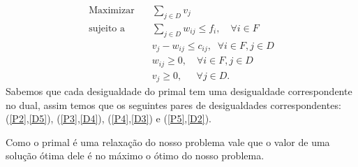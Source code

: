 \documentclass[12pt]{article}
\begin{document}
    \begin{align}
        \text{Maximizar} \quad & \sum_{j \in D} v_{j} \tag{D1} \label{D1}\\
        \text{sujeito a} \quad & \sum_{j\in D} w_{ij}\leq f_i, \quad \forall i \in F \tag{D2} \label{D2}\\
        &v_{j} - w_{ij}\leq c_{ij},  \; \; \forall i\in F,j\in D \tag{D3} \label{D3}\\
        &w_{ij} \geq 0 ,\quad \forall i\in F,j\in D\tag{D4} \label{D4}\\
        &v_j \geq 0, \quad \; \,\forall j\in D \tag{D5} \label{D5}.
       \end{align}
Sabemos que cada desigualdade do primal tem uma desigualdade correspondente no dual, assim temos que os seguintes pares de desigualdades correspondentes: (\ref{P2},\ref{D5}), (\ref{P3},\ref{D4}), (\ref{P4},\ref{D3}) e (\ref{P5},\ref{D2}).

Como o primal é uma relaxação do nosso problema vale que o valor de uma solução ótima dele é no máximo o ótimo do nosso problema.


\newpage
\end{document}
